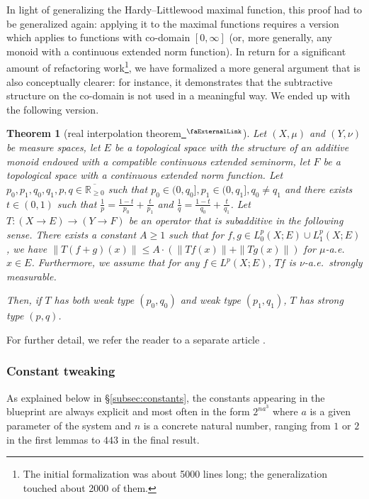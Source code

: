 \documentclass[12pt]{amsart}
\newcommand*{\real}{\mathbb{R}} %
\newcommand{\ennreal}{\overline{\real_{\ge0}}}
\newcommand{\extlink}{~\ensuremath{{}^\text{\faExternalLink}}}
\theoremstyle{definition}
\theoremstyle{plain}
\newtheorem{theorem}{Theorem}[subsection]
\begin{document}
In light of generalizing the Hardy--Littlewood maximal function, this proof had to be generalized again:
applying it to the maximal functions requires a version which applies to functions with co-domain $[0, \infty]$ (or, more generally, any monoid with a continuous extended norm function).
In return for a significant amount of refactoring work\footnote{The initial formalization was about 5000 lines long; the generalization touched about 2000 of them.},
we have formalized a more general argument that is also conceptually clearer: for instance, it demonstrates that the subtractive structure on the co-domain is not used in a meaningful way. We ended up with the following version.
\begin{theorem}[real interpolation theorem\href{https://github.com/fpvandoorn/carleson/blob/020d6e5c71d731952eb0379d222eea4049103ca0/Carleson/ToMathlib/RealInterpolation/Main.lean\#L1436}{\extlink}]
    Let $(X,\mu)$ and $(Y,\nu)$ be measure spaces, let $E$ be a topological space with the structure of an additive monoid endowed with a compatible continuous extended seminorm, let $F$ be a topological space with a continuous extended norm function.
    Let $p_0, p_1, q_0, q_1, p, q \in \ennreal$ such that $p_0 \in (0,q_0], p_1 \in (0,q_1], q_0 \ne q_1$ and there exists $t \in (0,1)$ such that $\frac{1}{p} = \frac{1-t}{p_0} + \frac{t}{p_1}$ and $\frac{1}{q} = \frac{1-t}{q_0} + \frac{t}{q_1}$.
    Let $T\colon (X \to E) \to (Y \to F)$ be an operator that is subadditive in the following sense. There exists a constant $A \ge 1$ such that for $f, g \in L^p_0(X; E) \cup L^p_1(X; E)$, we have $\|T(f+g)(x)\| \le A \cdot \left(\|Tf(x)\| + \|Tg(x)\|\right)$ for $\mu$-a.e.\ $x\in E$. Furthermore, we assume that for any $f\in L^p(X;E)$, $T f$ is $\nu$-a.e.\ strongly measurable.

    Then, if $T$ has both weak type $(p_0, q_0)$ and weak type $(p_1, q_1)$, $T$ has strong type $(p,q)$.
\end{theorem}
For further detail, we refer the reader to a separate article \cite{PortegiesRothgangRealInterpolation}.

\subsubsection{Constant tweaking}\label{subsubsec:const-tweak}
As explained below in
\S\ref{subsec:constants}, the constants appearing in the blueprint
are always explicit and most often in the form $2^{n a^3}$ where $a$ is a
given parameter of the system and $n$ is a concrete natural number, ranging
from $1$ or $2$ in the first lemmas to $443$ in the final result.
\end{document}
